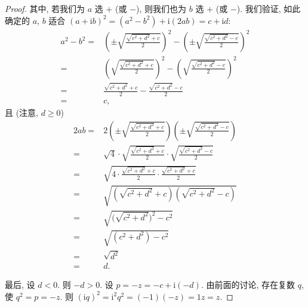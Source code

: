 \documentclass[../libro.tex]{subfiles}
\begin{document}
\begin{proof}
    其中, 若我们为 \(a\) 选 \(+\) (或 \(-\)),
    则我们也为 \(b\) 选 \(+\) (或 \(-\)).
    我们验证, 如此确定的 \(a\), \(b\) 适合
    \((a + \mathrm{i} b)^2
        = (a^2 - b^2) + \mathrm{i} (2 a b)
    = c + \mathrm{i} d\):
    \begin{align*}
        a^2 - b^2
        = {} &
        \left(\pm \sqrt{\frac{\sqrt{c^2 + d^2} + c}{2}}\right)^2
        -
        \left(\pm \sqrt{\frac{\sqrt{c^2 + d^2} - c}{2}}\right)^2
        \\
        = {} &
        \left(\sqrt{\frac{\sqrt{c^2 + d^2} + c}{2}}\right)^2
        -
        \left(\sqrt{\frac{\sqrt{c^2 + d^2} - c}{2}}\right)^2
        \\
        = {} &
        \frac{\sqrt{c^2 + d^2} + c}{2}
        - \frac{\sqrt{c^2 + d^2} - c}{2}
        \\
        = {} &
        c,
    \end{align*}
    且 (注意, \(d \geq 0\))
    \begin{align*}
        2 a b
        = {} &
        2
        \left(\pm \sqrt{\frac{\sqrt{c^2 + d^2} + c}{2}}\right)
        \left(\pm \sqrt{\frac{\sqrt{c^2 + d^2} - c}{2}}\right)
        \\
        = {} &
        \sqrt{4}
        \cdot \sqrt{\frac{\sqrt{c^2 + d^2} + c}{2}}
        \cdot \sqrt{\frac{\sqrt{c^2 + d^2} - c}{2}}
        \\
        = {} &
        \sqrt{4 \cdot \frac{\sqrt{c^2 + d^2} + c}{2}
        \cdot \frac{\sqrt{c^2 + d^2} + c}{2}}
        \\
        = {} &
        \sqrt{(\sqrt{c^2 + d^2} + c) (\sqrt{c^2 + d^2} - c)}
        \\
        = {} &
        \sqrt{\big(\sqrt{c^2 + d^2}\big)^2 - c^2}
        \\
        = {} &
        \sqrt{(c^2 + d^2) - c^2}
        \\
        = {} &
        \sqrt{d^2}
        \\
        = {} &
        d.
    \end{align*}

    最后, 设 \(d < 0\).
    则 \(-d > 0\).
    设 \(p = -z = -c + \mathrm{i} (-d)\).
    由前面的讨论, 存在复数 \(q\),
    使 \(q^2 = p = -z\).
    则 \((
        \mathrm{i} q)^2
        = \mathrm{i}^2 q^2
        = (-1) (-z)
        = 1 z
        = z
    \).
\end{proof}
\end{document}
